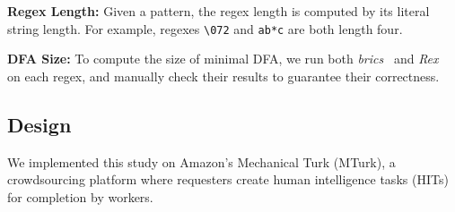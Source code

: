 \textbf{Regex Length:}
Given a pattern, the regex length is computed by its literal string length. For example, regexes \verb!\072! and \verb!ab*c! are both length four.

\textbf{DFA Size:}
To compute the size of minimal DFA, we run both \textit{brics}~\cite{brics} and \textit{Rex}~\cite{rex} on each regex, and manually check their results to guarantee their correctness.

\subsection{Design}
We implemented this study on Amazon's Mechanical Turk (MTurk), a crowdsourcing platform where requesters create human intelligence tasks (HITs) for completion by workers.

